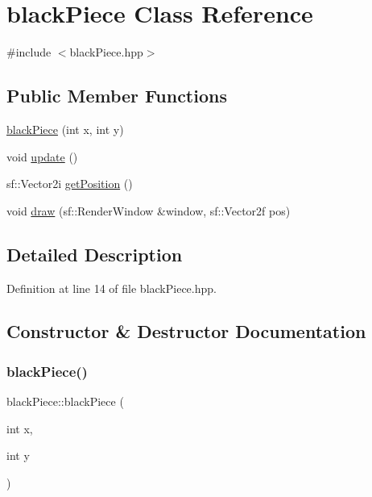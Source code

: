 \hypertarget{classblack_piece}{}\section{black\+Piece Class Reference}
\label{classblack_piece}


{\ttfamily \#include $<$black\+Piece.\+hpp$>$}

\subsection*{Public Member Functions}
\begin{DoxyCompactItemize}
\item 
\mbox{\hyperlink{classblack_piece_a79574283a1967fdfc782585aa3fb072b}{black\+Piece}} (int x, int y)
\item 
void \mbox{\hyperlink{classblack_piece_a8ab322b89affd828b413b3fee35827fa}{update}} ()
\item 
sf\+::\+Vector2i \mbox{\hyperlink{classblack_piece_aba875884346491615e27d4c5111b46a1}{get\+Position}} ()
\item 
void \mbox{\hyperlink{classblack_piece_ab73b4c4c5da2cd1571610deb79eaa9db}{draw}} (sf\+::\+Render\+Window \&window, sf\+::\+Vector2f pos)
\end{DoxyCompactItemize}


\subsection{Detailed Description}


Definition at line 14 of file black\+Piece.\+hpp.



\subsection{Constructor \& Destructor Documentation}
\mbox{\label{classblack_piece_a79574283a1967fdfc782585aa3fb072b}} 
\subsubsection{\texorpdfstring{blackPiece()}{blackPiece()}}
{\footnotesize\ttfamily black\+Piece\+::black\+Piece (\begin{DoxyParamCaption}\item[{int}]{x,  }\item[{int}]{y }\end{DoxyParamCaption})}

